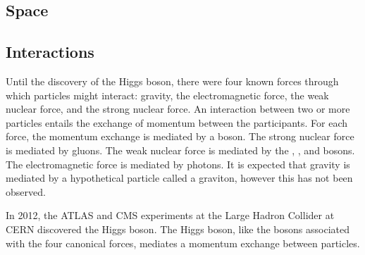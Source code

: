 \subsection{Space}

\subsection{Interactions}
Until the discovery of the Higgs boson, there were four known forces through which particles might interact: gravity, the electromagnetic force, the weak nuclear force, and the strong nuclear force.
An interaction between two or more particles entails the exchange of momentum between the participants.
For each force, the momentum exchange is mediated by a boson.
The strong nuclear force is mediated by gluons.
The weak nuclear force is mediated by the \Wp, \Wm, and \Z bosons.
The electromagnetic force is mediated by photons.
It is expected that gravity is mediated by a hypothetical particle called a graviton, however this has not been observed.

In 2012, the ATLAS and CMS experiments at the Large Hadron Collider at CERN discovered the Higgs boson.
The Higgs boson, like the bosons associated with the four canonical forces, mediates a momentum exchange between particles.
